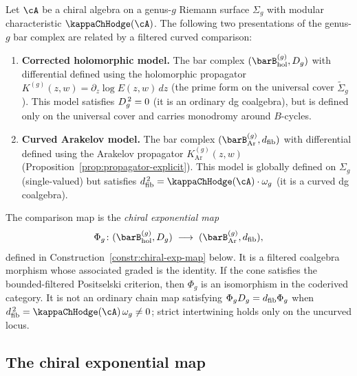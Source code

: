 \begin{theorem}
\label{thm:chiral-RH}
Let $\cA$ be a chiral algebra on a genus-$g$ Riemann surface
$\Sigma_g$ with modular characteristic $\kappaChHodge(\cA)$.
The following two presentations of the genus-$g$ bar complex are
related by a filtered curved comparison:
\begin{enumerate}[label=\textup{(\roman*)}]
\item \textbf{Corrected holomorphic model.}
 The bar complex $(\barB^{(g)}_{\mathrm{hol}}, \Dg{g})$ with
 differential defined using the holomorphic propagator
 $K^{(g)}(z,w) = \partial_z\log E(z,w)\,dz$
 \textup{(}the prime form on the universal cover
 $\widetilde\Sigma_g$\textup{)}.
 This model satisfies $D_{g}^{\,2} = 0$ (it is an ordinary
 dg coalgebra), but is defined only on the universal cover
 and carries monodromy around $B$-cycles.

\item \textbf{Curved Arakelov model.}
 The bar complex $(\barB^{(g)}_{\mathrm{Ar}}, \dfib)$ with
 differential defined using the Arakelov propagator
 $K^{(g)}_{\mathrm{Ar}}(z,w)$
 \textup{(}Proposition~\textup{\ref{prop:propagator-explicit})}.
 This model is globally defined on $\Sigma_g$
 \textup{(}single-valued\textup{)} but satisfies
 $\dfib^{\,2} = \kappaChHodge(\cA) \cdot \omega_g$ (it is a curved dg
 coalgebra).
\end{enumerate}
The comparison map is the \emph{chiral exponential map}
\begin{equation}\label{eq:chiral-exp-map}
 \Phi_g\colon
 (\barB^{(g)}_{\mathrm{hol}}, \Dg{g})
 \;\longrightarrow\;
 (\barB^{(g)}_{\mathrm{Ar}}, \dfib),
\end{equation}
defined in
Construction~\textup{\ref{constr:chiral-exp-map}} below. It is a
filtered coalgebra morphism whose associated graded is the identity.
If the cone satisfies the bounded-filtered Positselski criterion,
then $\Phi_g$ is an isomorphism in the coderived category. It is
not an ordinary chain map satisfying
$\Phi_gD_{g}=d_{\mathrm{fib}}\Phi_g$ when
$\dfib^{\,2}=\kappaChHodge(\cA)\,\omega_g\ne0$; strict intertwining holds only
on the uncurved locus.
\end{theorem}

\subsection{The chiral exponential map}
\label{subsec:chiral-exp-map}

